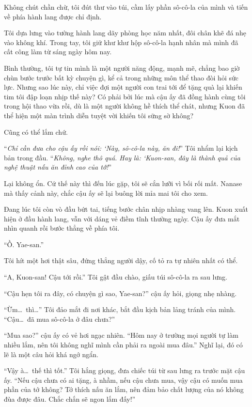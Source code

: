 \documentclass[../main.tex]{subfiles}
\begin{document}
Không chút chần chừ, tôi đút thư vào túi, cầm lấy phần sô-cô-la của mình và tiến về phía hành lang được chỉ định.

\ct


Tôi dựa lưng vào tường hành lang dãy phòng học năm nhất, đôi chân khẽ đá nhẹ vào không khí. Trong tay, tôi giữ khư khư hộp sô-cô-la hạnh nhân mà mình đã cất công làm từ sáng ngày hôm nay.

Bình thường, tôi tự tin mình là một người năng động, mạnh mẽ, chẳng bao giờ chùn bước trước bất kỳ chuyện gì, kể cả trong những môn thể thao đòi hỏi sức lực. Nhưng sao lúc này, chỉ việc đợi một người con trai tới để tặng quà lại khiến tim tôi đập loạn nhịp thế này? Có phải bởi lúc mà cậu ấy đã đồng hành cùng tôi trong hội thao vừa rồi, dù là một người không hề thích thể chát, nhưng Kuon đã thể hiện một màn trình diễn tuyệt vời khiến tôi sững sờ không?

Cũng có thể lắm chứ.

``\textit{Chỉ cần đưa cho cậu ấy rồi nói: `Này, sô-cô-la này, ăn đi!}'' Tôi nhẩm lại kịch bản trong đầu. ``\textit{Không, nghe thô quá. Hay là: `Kuon-san, đây là thành quả của nghệ thuật nấu ăn đỉnh cao của tớ!}''

Lại không ổn. Cứ thế này thì đến lúc gặp, tôi sẽ cắn lưỡi vì bối rối mất. Nanase mà thấy cảnh này, chắc cậu ấy sẽ lại buông lời mỉa mai tôi cho xem.

Đang lúc tôi còn vò đầu bứt tai, tiếng bước chân nhịp nhàng vang lên. Kuon xuất hiện ở đầu hành lang, vẫn với dáng vẻ điềm tĩnh thường ngày. Cậu ấy đưa mắt nhìn quanh rồi bước thẳng về phía tôi.

``Ồ. Yae-san.''

Tôi hít một hơi thật sâu, đứng thẳng người dậy, cố tỏ ra tự nhiên nhất có thể.

``A, Kuon-san! Cậu tới rồi.'' Tôi gật đầu chào, giấu túi sô-cô-la ra sau lưng.

``Cậu hẹn tôi ra đây, có chuyện gì sao, Yae-san?'' cậu ấy hỏi, giọng nhẹ nhàng.

``Ừm\dots\ thì\dots'' Tôi đảo mắt đi nơi khác, bắt đầu kịch bản lảng tránh của mình. ``Cậu\dots\ đã mua sô-cô-la ở đâu chưa?''

``Mua sao?'' cậu ấy có vẻ hơi ngạc nhiên. ``Hôm nay ở trường mọi người tự làm nhiều lắm, nên tôi không nghĩ mình cần phải ra ngoài mua đâu.'' Nghĩ lại, đó có lẽ là một câu hỏi khá ngớ ngẩn.

``Vậy à\dots\ thế thì tốt.'' Tôi hắng giọng, đưa chiếc túi từ sau lưng ra trước mặt cậu ấy. ``Nếu cậu chưa có ai tặng, à nhầm, nếu cậu chưa mua, vậy cậu có muốn mua phần của tớ không? Tớ thích nấu ăn lắm, nên đảm bảo chất lượng của nó không đùa được đâu. Chắc chắn sẽ ngon lắm đấy!''
\end{document}
